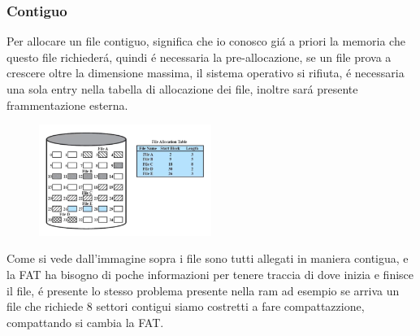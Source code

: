 \subsubsection*{Contiguo}
Per allocare un file contiguo, significa che io conosco giá a priori la memoria che questo file richiederá, quindi
é necessaria la pre-allocazione, se un file prova a crescere oltre la dimensione massima, il sistema operativo
si rifiuta, é necessaria una sola entry nella tabella di allocazione dei file, inoltre sará presente frammentazione esterna.
\begin{figure}[H]
    \centering
    \includegraphics[width=0.5\textwidth]{immagini/AllocazioneContigua}
\end{figure}
Come si vede dall'immagine sopra i file sono tutti allegati in maniera contigua, e la FAT ha bisogno
di poche informazioni per tenere traccia di dove inizia e finisce il file, é presente lo stesso
problema presente nella ram ad esempio se arriva un file che richiede 8 settori contigui siamo costretti a
fare compattazzione, compattando si cambia la FAT.
